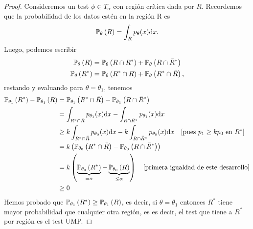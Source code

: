 \begin{proof}
	Consideremos un test $\phi\in T_\alpha$ con región crítica dada por $R$. Recordemos que  la probabilidad de los datos estén en la región R es 
	\begin{equation}
		\mathbb{P}_\theta \left(R\right) = \int_R p_\theta(x){\text{d}x}.
	\end{equation}
	Luego, podemos escribir 
	\begin{align}
		\mathbb{P}_\theta \left(R\right) &= \mathbb{P}_\theta \left(R\cap R^*\right) + \mathbb{P}_\theta \left(R\cap \bar{R}^*\right)\\
		\mathbb{P}_\theta \left(R^*\right) &= \mathbb{P}_\theta \left(R^*\cap R\right) + \mathbb{P}_\theta \left(R^*\cap \bar{R}\right),
	\end{align}
	restando y evaluando para $\theta=\theta_1$, tenemos
	\begin{align}
	\mathbb{P}_{\theta_1} \left(R^*\right) - \mathbb{P}_{\theta_1} \left(R\right) 	&=  \mathbb{P}_{\theta_1} \left(R^*\cap \bar{R}\right) - \mathbb{P}_{\theta_1} \left(R\cap \bar{R}^*\right)\nonumber \\
								&=  \int_{R^*\cap \bar{R}} p_{\theta_1}(x){\text{d}x} - \int_{R\cap \bar{R}^*} p_{\theta_1}(x){\text{d}x}\nonumber\\
									&\geq  k\int_{R^*\cap \bar{R}} p_{\theta_0}(x){\text{d}x} - k\int_{R\cap \bar{R}^*} p_{\theta_0}(x){\text{d}x} \quad[\text{pues } p_1\geq k p_0 \text{ en } R^*]\nonumber\\
									&= k\left( \mathbb{P}_{\theta_0} \left(R^*\cap \bar{R}\right) - \mathbb{P}_{\theta_0} \left(R\cap \bar{R}^*\right)\right)\nonumber \\
									&= k\left( \underbrace{\mathbb{P}_{\theta_0} \left(R^*\right)}_{=\alpha} - \underbrace{\mathbb{P}_{\theta_0} \left(R\right)}_{\leq\alpha}\right) \quad[\text{primera igualdad de este desarrollo}]\nonumber\\
									&\geq 0
	\end{align}
	Hemos probado que $\mathbb{P}_{\theta_1} \left(R^*\right) \geq \mathbb{P}_{\theta_1} \left(R\right)$, es decir, si $\theta = \theta_1$ entonces $R^*$ tiene mayor probabilidad que cualquier otra región, es es decir, el test que tiene a $R^*$ por región es el test UMP.

	
\end{proof}



